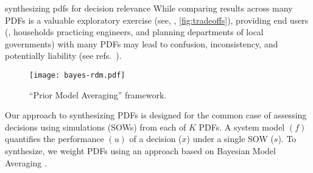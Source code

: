 \begin{block}{synthesizing pdfs for decision relevance}
    While comparing results across many PDFs is a valuable exploratory exercise (see, \eg, \cref{fig:tradeoffs}), providing end users (\eg, households practicing engineers, and planning departments of local governments) with many PDFs may lead to confusion, inconsistency, and potentially liability (see refs.~\cite{schneider_dangerous:2001,schneider_scenarios:2002}).
    \begin{framed}
        \begin{figure}
            \centering
            \texttt{[image: bayes-rdm.pdf]}
            \caption{
                ``Prior Model Averaging'' framework.
            }\label{fig:flowchart}
        \end{figure}
    \end{framed}
    Our approach to synthesizing PDFs is designed for the common case of assessing decisions using simulations (SOWs) from each of $K$ PDFs.
    A system model $(f)$ quantifies the performance $(u)$ of a decision ($x$) under a single SOW ($s$).
    To synthesize, we weight PDFs using an approach based on Bayesian Model Averaging \cite{wong_surge:2018,Yao:2018bu}.
\end{block}